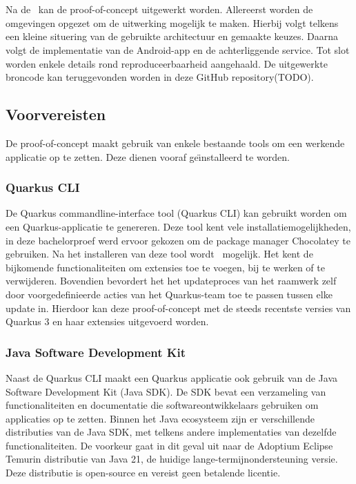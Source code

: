 
\chapter{}
\label{ch:proof-of-concept}
Na de~ kan de proof-of-concept uitgewerkt worden.
Allereerst worden de omgevingen opgezet om de uitwerking mogelijk te maken.
Hierbij volgt telkens een kleine situering van de gebruikte architectuur en gemaakte keuzes.
Daarna volgt de implementatie van de Android-app en de achterliggende service.
Tot slot worden enkele details rond reproduceerbaarheid aangehaald.
De uitgewerkte broncode kan teruggevonden worden in deze GitHub repository(TODO). %


\section{Voorvereisten}
\label{sec:voorvereisten}
De proof-of-concept maakt gebruik van enkele bestaande tools om een werkende applicatie op te zetten.
Deze dienen vooraf ge\"{\i}nstalleerd te worden.

\subsection{Quarkus CLI}
\label{subsec:de-quarkus-cli}
De Quarkus commandline-interface tool (Quarkus CLI) kan gebruikt worden om een Quarkus-applicatie te genereren.
Deze tool kent vele installatiemogelijkheden, in deze bachelorproef werd ervoor gekozen om de package manager Chocolatey te gebruiken.
Na het installeren van deze tool wordt~ mogelijk.
Het kent de bijkomende functionaliteiten om extensies toe te voegen, bij te werken of te verwijderen.
Bovendien bevordert het het updateproces van het raamwerk zelf door voorgedefinieerde acties van het Quarkus-team toe te passen tussen elke update in.
Hierdoor kan deze proof-of-concept met de steeds recentste versies van Quarkus 3 en haar extensies uitgevoerd worden.

\subsection{Java Software Development Kit}
\label{subsec:java-software-development-kit}
Naast de Quarkus CLI maakt een Quarkus applicatie ook gebruik van de Java Software Development Kit (Java SDK).
De SDK bevat een verzameling van functionaliteiten en documentatie die softwareontwikkelaars gebruiken om applicaties op te zetten.
Binnen het Java ecosysteem zijn er verschillende distributies van de Java SDK, met telkens andere implementaties van dezelfde functionaliteiten.
De voorkeur gaat in dit geval uit naar de Adoptium Eclipse Temurin distributie van Java 21, de huidige lange-termijnondersteuning versie.
Deze distributie is open-source en vereist geen betalende licentie.

